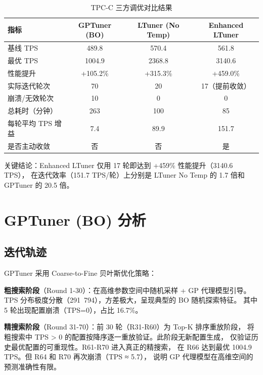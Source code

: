 \begin{table}[h]
\centering
\caption{TPC-C 三方调优对比结果}
\label{tab:tpcc-results}
\begin{tabular}{l|ccc}
\hline
\textbf{指标} & \textbf{GPTuner (BO)} & \textbf{LTuner (No Temp)} & \textbf{Enhanced LTuner} \\
\hline
基线 TPS             & 489.8     & 570.4     & 561.8     \\
最优 TPS             & 1004.9    & 2368.8    & 3140.6    \\
性能提升             & +105.2\%  & +315.3\%  & +459.0\%  \\
实际迭代轮次         & 70        & 20        & 17（提前收敛） \\
崩溃/无效轮次        & 10        & 0         & 0         \\
总耗时（分钟）       & 263       & 100       & 85        \\
每轮平均 TPS 增益    & 7.4       & 89.9      & 151.7     \\
是否主动收敛         & 否        & 否        & 是        \\
\hline
\end{tabular}
\end{table}

关键结论：Enhanced LTuner 仅用 17 轮即达到 +459\% 性能提升（3140.6 TPS），
在迭代效率（151.7 TPS/轮）上分别是 LTuner No Temp 的 1.7 倍和 GPTuner 的 20.5 倍。



\section{GPTuner (BO) 分析}

\subsection{迭代轨迹}

GPTuner 采用 Coarse-to-Fine 贝叶斯优化策略：

\textbf{粗搜索阶段}（Round 1-30）：在高维参数空间中随机采样 + GP 代理模型引导。
TPS 分布极度分散（291~794），方差极大，呈现典型的 BO 随机探索特征。
其中 5 轮出现配置崩溃（TPS=0），占比 16.7\%。

\textbf{精搜索阶段}（Round 31-70）：前 30 轮（R31-R60）为 Top-K 排序重放阶段，
将粗搜索中 TPS > 0 的配置按降序逐一重放验证。此阶段无新配置生成，
仅验证历史最优配置的可重现性。R61-R70 进入真正的精搜索，
在 R66 达到最优 1004.9 TPS。但 R64 和 R70 再次崩溃（TPS ≈ 5.7），
说明 GP 代理模型在高维空间的预测准确性有限。

